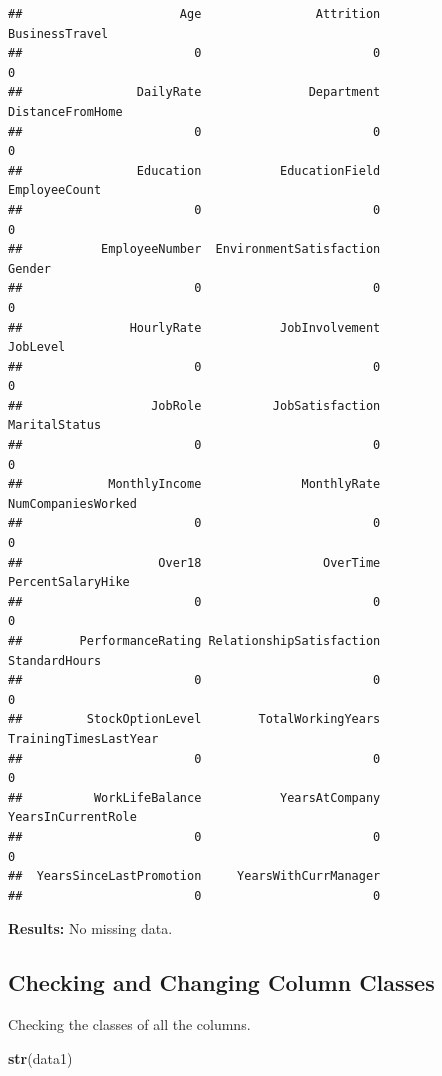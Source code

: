 \documentclass[
]{article}
\newenvironment{Shaded}{\begin{snugshade}}{\end{snugshade}}
\newcommand{\KeywordTok}[1]{\textcolor[rgb]{0.13,0.29,0.53}{\textbf{#1}}}
\newcommand{\NormalTok}[1]{#1}
\begin{document}
\begin{verbatim}
##                      Age                Attrition           BusinessTravel 
##                        0                        0                        0 
##                DailyRate               Department         DistanceFromHome 
##                        0                        0                        0 
##                Education           EducationField            EmployeeCount 
##                        0                        0                        0 
##           EmployeeNumber  EnvironmentSatisfaction                   Gender 
##                        0                        0                        0 
##               HourlyRate           JobInvolvement                 JobLevel 
##                        0                        0                        0 
##                  JobRole          JobSatisfaction            MaritalStatus 
##                        0                        0                        0 
##            MonthlyIncome              MonthlyRate       NumCompaniesWorked 
##                        0                        0                        0 
##                   Over18                 OverTime        PercentSalaryHike 
##                        0                        0                        0 
##        PerformanceRating RelationshipSatisfaction            StandardHours 
##                        0                        0                        0 
##         StockOptionLevel        TotalWorkingYears    TrainingTimesLastYear 
##                        0                        0                        0 
##          WorkLifeBalance           YearsAtCompany       YearsInCurrentRole 
##                        0                        0                        0 
##  YearsSinceLastPromotion     YearsWithCurrManager 
##                        0                        0
\end{verbatim}

\textbf{Results:} No missing data.

\hypertarget{checking-and-changing-column-classes}{%
\subsection{Checking and Changing Column
Classes}\label{checking-and-changing-column-classes}}

Checking the classes of all the columns.

\begin{Shaded}
\begin{Highlighting}[]
\KeywordTok{str}\NormalTok{(data1)}
\end{Highlighting}
\end{Shaded}
\end{document}
